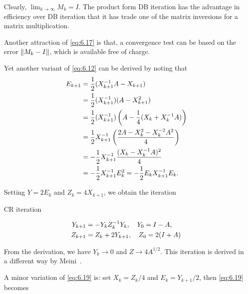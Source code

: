 \documentclass{article}
\begin{document}
Clearly, $\lim_{k\to \infty} M_k = I$. The product form DB iteration has
the advantage in efficiency over DB iteration that it has trade one of the
matrix inversions for a matrix multiplication.

Another attraction of \eqref{eq:6.17} is that, a convergence test can be
based on the error $\|{M_k-I}\|$, which is available free of charge.

Yet another variant of \eqref{eq:6.12} can be derived by noting that
\begin{equation}\notag
  \begin{aligned}
    E_{k + 1} & = \frac{1}{2}(X_{k + 1}^{-1} A - X_{k + 1}) \\ 
              & = \frac{1}{2} (X_{k + 1}^{-1})(A- X_{k + 1}^2) \\
              & = \frac{1}{2} (X_{k + 1}^{-1})\left(A - \frac{1}{4}(X_k + X_k^{-1}
                A)\right) \\
              & = \frac{1}{2} X_{k + 1}^{-1} \left( \frac{2A - X_k^2 - X_k^{-2}A^2}{4}
                \right) \\ 
              & = -\frac{1}{2} X_{k + 1}^{-1} \frac{(X_k - X_k^{-1}
                A)^2}{4}\\ 
              & = -\frac{1}{2}X_{k + 1}^{-1} E_k^2 = -\frac{1}{2}E_kX_{k +
                1}^{-1} E_k. 
  \end{aligned}
\end{equation}

Setting $Y = 2E_k$ and $Z_k = 4X_{k + 1}$, we obtain the iteration
\begin{mybox}{}
  \begin{center}
    \textsf{CR iteration}
  \end{center}
  \begin{equation}
    \label{eq:6.19}
    \begin{aligned}
      Y_{k + 1}& = - Y_k Z_k^{-1} Y_k,\quad Y_0 = I - A,\\ 
      Z_{k + 1}& = Z_k + 2Y_{k + 1},\quad Z_0 = 2(I + A)
    \end{aligned}
  \end{equation}
\end{mybox}

From the derivation, we have $Y_k \to 0$ and $Z \to 4A^{1/2}$. This
iteration is derived in a different way by Meini~\cite{mein04}.

A minor variation of \eqref{eq:6.19} is: set $X_k = Z_k/4$ and
$E_k = Y_{k + 1} /2$, then \eqref{eq:6.19} becomes
\end{document}
